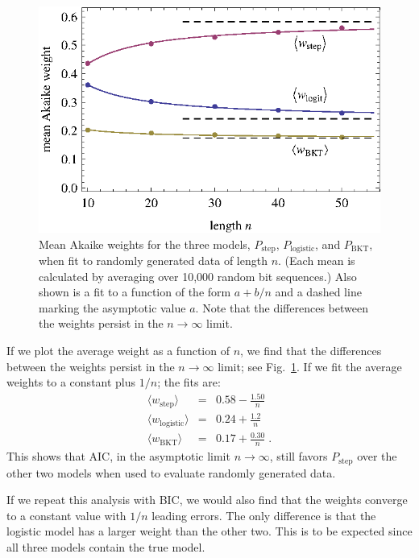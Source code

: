 \documentclass{acmlarge-edm}
\begin{document}
\begin{figure}
   \centering\includegraphics{mean-weights.eps}
  \caption{Mean Akaike weights for the three models, 
   $P_\mathrm{step}$, $P_\mathrm{logistic}$, and $P_\mathrm{BKT}$, 
   when fit to randomly generated data of length $n$.
   (Each mean is calculated by averaging over 10,000 random bit sequences.)
   Also shown is a fit to a function of the form $a+b/n$ and
   a dashed line marking the asymptotic value $a$.
   Note that the differences between the weights persist
   in the $n\to\infty$ limit.}\label{meanweight}
\end{figure}

If we plot the average weight as a function of $n$, we find
that the differences between the weights persist
in the $n\to\infty$ limit;  see Fig.~\ref{meanweight}.
If we fit the average weights to a constant plus $1/n$;
the fits are:
%
\begin{eqnarray}
 \langle w_\mathrm{step}\rangle &=& 0.58 - \frac{1.50}{n} \\
 \langle w_\mathrm{logistic}\rangle &=& 0.24 + \frac{1.2}{n} \\
 \langle w_\mathrm{BKT}\rangle &=& 0.17+\frac{0.30}{n} \; .
\end{eqnarray}
%
This shows that AIC, in the asymptotic limit $n\to\infty$, 
still favors  $P_\mathrm{step}$ over the other two models
when used to evaluate randomly generated data.

If we repeat this analysis with BIC, we would also
find that the weights converge to a constant value with 
$1/n$ leading errors.  The only difference is that the logistic
model has a larger weight than the other two.  This is to be
expected since all three models contain the true model.
\end{document}
